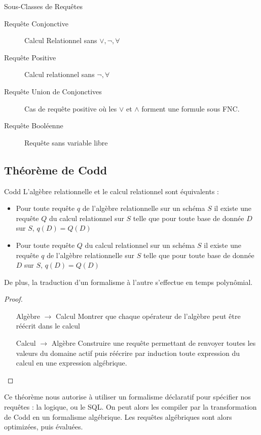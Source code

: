 \documentclass{cours}
\begin{document}
\begin{définition}{Sous-Classes de Requêtes}{}
    \begin{description}
        \item[Requête Conjonctive] Calcul Relationnel sans $\lor, \lnot, \forall$
        \item[Requête Positive] Calcul relationnel sans $\lnot, \forall$
        \item[Requête Union de Conjonctives] Cas de requête positive où les $\lor$ et $\land$ forment une formule sous FNC. 
        \item[Requête Booléenne] Requête sans variable libre  
    \end{description}
\end{définition}

\subsection{Théorème de Codd}
\begin{théorème}{Codd}{}
    L'algèbre relationnelle et le calcul relationnel sont équivalents : 
    \begin{itemize}
        \item Pour toute requête $q$ de l'algèbre relationnelle sur un schéma $S$ il existe une requête $Q$ du calcul relationnel sur $S$ telle que pour toute base de donnée $D$ sur $S$, $q(D) = Q(D)$
        \item Pour toute requête $Q$ du calcul relationnel sur un schéma $S$ il existe une requête $q$ de l'algèbre relationnelle sur $S$ telle que pour toute base de donnée $D$ sur $S$, $q(D) = Q(D)$
    \end{itemize}
    De plus, la traduction d'un formalisme à l'autre s'effectue en temps polynômial. 
\end{théorème}
\begin{proof}
    \begin{itemize}
        \item[Algèbre $\to$ Calcul] Montrer que chaque opérateur de l'algèbre peut être réécrit dans le calcul
        \item[Calcul $\to$ Algèbre] Construire une requête permettant de renvoyer toutes les valeurs du domaine actif puis réécrire par induction toute expression du calcul en une expression algébrique.
    \end{itemize}
\end{proof}

Ce théorème nous autorise à utiliser un formalisme déclaratif pour spécifier nos requêtes : la logique, ou le SQL. On peut alors les compiler par la transformation de Codd en un formalisme algébrique. Les requêtes algébriques sont alors optimizées, puis évaluées. 
\end{document}
